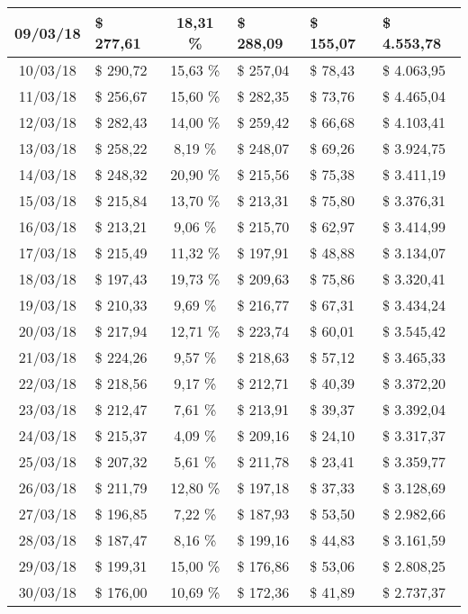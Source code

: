 \begin{center}
\begin{small}
\begin{longtable}{|c|l|c|l|l|l|}
09/03/18 & \$ 277,61 & 18,31 \% & \$ 288,09 & \$ 155,07 & \$ 4.553,78 \\ \hline
10/03/18 & \$ 290,72 & 15,63 \% & \$ 257,04 & \$ 78,43 & \$ 4.063,95 \\ \hline
11/03/18 & \$ 256,67 & 15,60 \% & \$ 282,35 & \$ 73,76 & \$ 4.465,04 \\ \hline
12/03/18 & \$ 282,43 & 14,00 \% & \$ 259,42 & \$ 66,68 & \$ 4.103,41 \\ \hline
13/03/18 & \$ 258,22 & 8,19 \% & \$ 248,07 & \$ 69,26 & \$ 3.924,75 \\ \hline
14/03/18 & \$ 248,32 & 20,90 \% & \$ 215,56 & \$ 75,38 & \$ 3.411,19 \\ \hline
15/03/18 & \$ 215,84 & 13,70 \% & \$ 213,31 & \$ 75,80 & \$ 3.376,31 \\ \hline
16/03/18 & \$ 213,21 & 9,06 \% & \$ 215,70 & \$ 62,97 & \$ 3.414,99 \\ \hline
17/03/18 & \$ 215,49 & 11,32 \% & \$ 197,91 & \$ 48,88 & \$ 3.134,07 \\ \hline
18/03/18 & \$ 197,43 & 19,73 \% & \$ 209,63 & \$ 75,86 & \$ 3.320,41 \\ \hline
19/03/18 & \$ 210,33 & 9,69 \% & \$ 216,77 & \$ 67,31 & \$ 3.434,24 \\ \hline
20/03/18 & \$ 217,94 & 12,71 \% & \$ 223,74 & \$ 60,01 & \$ 3.545,42 \\ \hline
21/03/18 & \$ 224,26 & 9,57 \% & \$ 218,63 & \$ 57,12 & \$ 3.465,33 \\ \hline
22/03/18 & \$ 218,56 & 9,17 \% & \$ 212,71 & \$ 40,39 & \$ 3.372,20 \\ \hline
23/03/18 & \$ 212,47 & 7,61 \% & \$ 213,91 & \$ 39,37 & \$ 3.392,04 \\ \hline
24/03/18 & \$ 215,37 & 4,09 \% & \$ 209,16 & \$ 24,10 & \$ 3.317,37 \\ \hline
25/03/18 & \$ 207,32 & 5,61 \% & \$ 211,78 & \$ 23,41 & \$ 3.359,77 \\ \hline
26/03/18 & \$ 211,79 & 12,80 \% & \$ 197,18 & \$ 37,33 & \$ 3.128,69 \\ \hline
27/03/18 & \$ 196,85 & 7,22 \% & \$ 187,93 & \$ 53,50 & \$ 2.982,66 \\ \hline
28/03/18 & \$ 187,47 & 8,16 \% & \$ 199,16 & \$ 44,83 & \$ 3.161,59 \\ \hline
29/03/18 & \$ 199,31 & 15,00 \% & \$ 176,86 & \$ 53,06 & \$ 2.808,25 \\ \hline
30/03/18 & \$ 176,00 & 10,69 \% & \$ 172,36 & \$ 41,89 & \$ 2.737,37 \\ \hline

\end{longtable}
\end{small}
\end{center}
